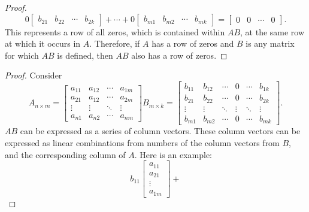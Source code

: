 \documentclass{article}
\begin{document}
\begin{enumerate}
{\begin{enumerate}
\begin{proof}
\[                    0\begin{bmatrix} b_{21} & b_{22} & \cdots & b_{2k}\end{bmatrix} + \cdots +
                    0\begin{bmatrix} b_{m1} & b_{m2} & \cdots & b_{mk}\end{bmatrix} =
                    \begin{bmatrix} 0 & 0 & \cdots & 0 \end{bmatrix}.
                \]
                This represents a row of all zeros, which is contained within $AB$, at the same row at which it occurs in $A$. Therefore, if $A$ has a row of zeros and $B$ is any matrix for which $AB$ is defined, then $AB$ also has a row of zeros.
            \end{proof}
            \begin{proof}
                Consider
                \[
                    A_{n \times m} = \begin{bmatrix}
                        a_{11} & a_{12} & \cdots & a_{1m} \\
                        a_{21} & a_{12} & \cdots & a_{2m} \\
                        \vdots & \vdots & \ddots & \vdots \\
                        a_{n1} & a_{n2} & \cdots & a_{nm}
                    \end{bmatrix}
                    B_{m \times k} = \begin{bmatrix}
                        b_{11} & b_{12} & \cdots & 0      & \cdots & b_{1k} \\
                        b_{21} & b_{22} & \cdots & 0      & \cdots & b_{2k} \\
                        \vdots & \vdots & \ddots & \vdots & \ddots & \vdots \\
                        b_{m1} & b_{m2} & \cdots & 0      & \cdots & b_{mk}
                    \end{bmatrix}.
                \]
                $AB$ can be expressed as a series of column vectors. These column vectors can be expressed as linear combinations from numbers of the column vectors from $B$, and the corresponding column of $A$. Here is an example:
                \[
                    b_{11}\begin{bmatrix} a_{11} \\ a_{21} \\ \vdots \\ a_{1m}\end{bmatrix} +
\]
\end{proof}
\end{enumerate}}
\end{enumerate}
\end{document}
